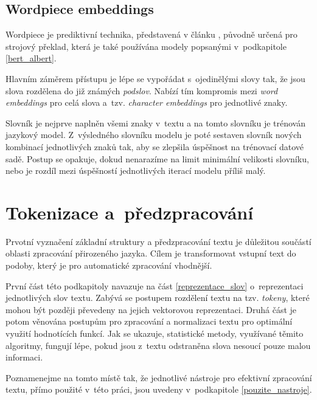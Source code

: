 \subsection{Wordpiece embeddings}
\label{wordpiece_embb}
Wordpiece je prediktivní technika, představená v článku \cite{wordpiece}, původně určená pro strojový překlad, která je také používána modely popsanými v~podkapitole \ref{bert_albert}.\par
Hlavním záměrem přístupu je lépe se vypořádat s~ojedinělými slovy tak, že jsou slova rozdělena do již známých \emph{podslov}. Nabízí tím kompromis mezi \emph{word embeddings} pro celá slova a~tzv. \emph{character embeddings} pro jednotlivé znaky.\par
Slovník je nejprve naplněn všemi znaky v~textu a na tomto slovníku je trénován jazykový model. Z~výsledného slovníku modelu je poté sestaven slovník nových kombinací jednotlivých znaků tak, aby se zlepšila úspěšnost na trénovací datové sadě. Postup se opakuje, dokud nenarazíme na limit minimální velikosti slovníku, nebo je rozdíl mezi úspěšností jednotlivých iterací modelu příliš malý.

\section{Tokenizace a~předzpracování}
\label{preprocessing}
Prvotní vyznačení základní struktury a předzpracování textu je důležitou součástí oblasti zpracování přirozeného jazyka. Cílem je transformovat vstupní text do podoby, který je pro automatické zpracování vhodnější. \par
První část této podkapitoly navazuje na část \ref{reprezentace_slov} o~reprezentaci jednotlivých slov textu. Zabývá se postupem rozdělení textu na tzv. \emph{tokeny}, které mohou být později převedeny na jejich vektorovou reprezentaci. Druhá část je potom věnována postupům pro zpracování a normalizaci textu pro optimální využití hodnotících funkcí. Jak se ukazuje, statistické metody, využívané těmito algoritmy, fungují lépe, pokud jsou z~textu odstraněna slova nesoucí pouze malou informaci. \par
Poznamenejme na tomto místě tak, že jednotlivé nástroje pro efektivní zpracování textu, přímo použité v~této práci, jsou uvedeny v~podkapitole \ref{pouzite_nastroje}.

